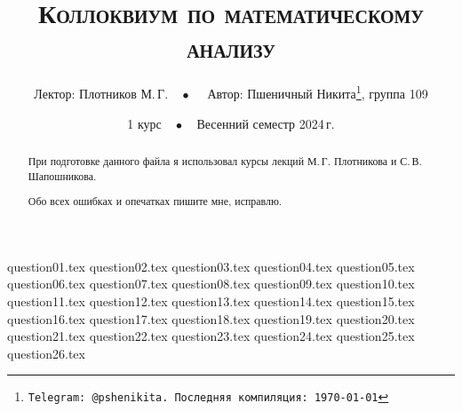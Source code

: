 \documentclass[a4paper, 11pt]{article}
\begin{document}
\title{\bfseries\scshape Коллоквиум по математическому анализу}
\date{1 курс$\quad\bullet\quad$Весенний семестр 2024\,г.}
\author{Лектор: Плотников М.\,Г.$\quad\bullet\quad$ Автор: Пшеничный Никита\thanks{\texttt{Telegram: @pshenikita. Последняя компиляция: \today}}, группа 109}

\maketitle

\begin{abstract}
    При подготовке данного файла я использовал курсы лекций М.\,Г. Плотникова и С.\,В. Шапошникова.

    Обо всех ошибках и опечатках пишите мне, исправлю.
\end{abstract}

\tableofcontents

\newpage

{question01.tex}
{question02.tex}
{question03.tex}
{question04.tex}
{question05.tex}
{question06.tex}
{question07.tex}
{question08.tex}
{question09.tex}
{question10.tex}
{question11.tex}
{question12.tex}
{question13.tex}
{question14.tex}
{question15.tex}
{question16.tex}
{question17.tex}
{question18.tex}
{question19.tex}
{question20.tex}
{question21.tex}
{question22.tex}
{question23.tex}
{question24.tex}
{question25.tex}
{question26.tex}
\end{document}
